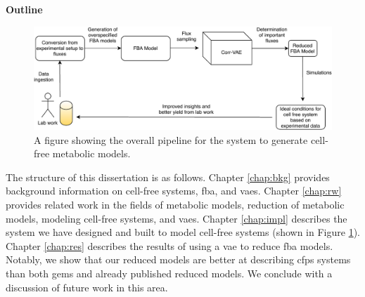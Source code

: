 \textbf{Outline}
\begin{figure}[t!]
\begin{center}
\includegraphics[width=\textwidth]{figs/SystemOverview.pdf}
\end{center}
\label{fig:overview}
\caption{A figure showing the overall pipeline for the system to generate cell-free metabolic models.}
\end{figure}

The structure of this dissertation is as follows.
Chapter \ref{chap:bkg} provides background information on cell-free systems, \gls{fba}, and \glspl{vae}.
Chapter \ref{chap:rw} provides related work in the fields of metabolic models, reduction of metabolic models, modeling cell-free systems, and \glspl{vae}.
Chapter \ref{chap:impl} describes the system we have designed and built to model cell-free systems (shown in Figure \ref{fig:overview}).
Chapter \ref{chap:res} describes the results of using a \gls{vae} to reduce \gls{fba} models.
Notably, we show that our reduced models are better at describing \gls{cfps} systems than both \glspl{gem} and already published reduced models.
We conclude with a discussion of future work in this area.
